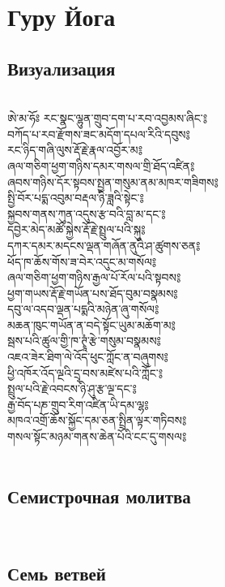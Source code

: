 \section{Гуру Йога}

\subsection{Визуализация}
\\
\ti
ཨེ་མ་ཧོཿ  རང་སྣང་ལྷུན་གྲུབ་དག་པ་རབ་འབྱམས་ཞིང་༔ \\
བཀོད་པ་རབ་རྫོགས་ཟང་མདོག་དཔལ་རིའི་དབུས༔\\
རང་ཉིད་གཞི་ལུས་རྡོ་རྗེ་རྣལ་འབྱོར་མ༔\\
ཞལ་གཅིག་ཕྱག་གཉིས་དམར་གསལ་གྲི་ཐོད་འཛིན༔\\
ཞབས་གཉིས་དོར་སྟབས་སྤྱན་གསུམ་ནམ་མཁར་གཟིགས༔\\
སྤྱི་བོར་པདྨ་འབུམ་བརྡལ་ཉི་ཟླའི་སྟེང་༔\\
སྐྱབས་གནས་ཀུན་འདུས་རྩ་བའི་བླ་མ་དང་༔\\
དབྱེར་མེད་མཚོ་སྐྱེས་རྡོ་རྗེ་སྤྲུལ་པའི་སྐུ༔\\
དཀར་དམར་མདངས་ལྡན་གཞོན་ནུའི་ཤ་ཚུགས་ཅན༔\\
ཕོད་ཁ་ཆོས་གོས་ཟ་བེར་འདུང་མ་གསོལ༔\\
ཞལ་གཅིག་ཕྱག་གཉིས་རྒྱལ་པོ་རོལ་པའི་སྟབས༔\\
ཕྱག་གཡས་རྡོ་རྗེ་གཡོན་པས་ཐོད་བུམ་བསྣམས༔\\
དབུ་ལ་འདབ་ལྡན་པདྨའི་མཉེན་ཞུ་གསོལ༔\\
མཆན་ཁུང་གཡོན་ན་བདེ་སྟོང་ཡུམ་མཆོག་མ༔\\
སྦས་པའི་ཚུལ་གྱི་ཁ་ཊྭཱཾ་རྩེ་གསུམ་བསྣམས༔\\
འཇའ་ཟེར་ཐིག་ལེ་འོད་ཕུང་ཀློང་ན་བཞུགས༔\\
ཕྱི་འཁོར་འོད་ལྔའི་དྲྭ་བས་མཛེས་པའི་ཀློང་༔\\
སྤྲུལ་པའི་རྗེ་འབངས་ཉི་ཤུ་རྩ་ལྔ་དང་༔\\
རྒྱ་བོད་པཎ་གྲུབ་རིག་འཛིན་ཡི་དམ་ལྷ༔\\
མཁའ་འགྲོ་ཆོས་སྐྱོང་དམ་ཅན་སྤྲིན་ལྟར་གཏིབས༔\\
གསལ་སྟོང་མཉམ་གནས་ཆེན་པོའི་ངང་དུ་གསལ༔\\
\\
\ru
\subsection{Семистрочная молитва}
\\
\subsection{Семь ветвей}
